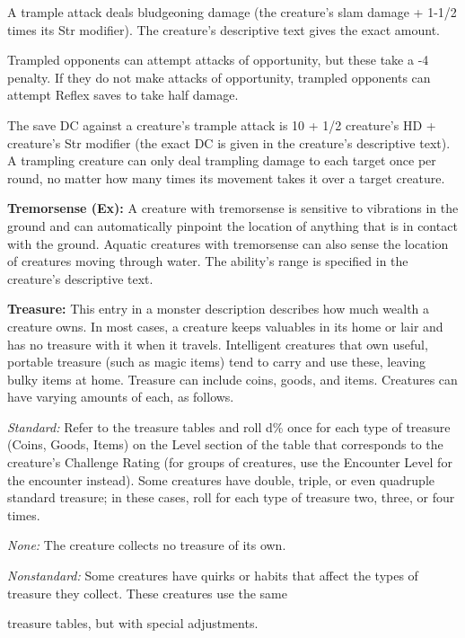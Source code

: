 \documentclass{article}
\begin{document}
A trample attack deals bludgeoning damage (the creature's slam damage + 1-1/2 times 
its Str modifier). The creature's descriptive text gives the exact amount.

Trampled opponents can attempt attacks of opportunity, but these take a -4 penalty. 
If they do not make attacks of opportunity, trampled opponents can attempt Reflex 
saves to take half damage.

The save DC against a creature's trample attack is 10 + 1/2 creature's HD + creature's 
Str modifier (the exact DC is given in the creature's descriptive text). A trampling 
creature can only deal trampling damage to each target once per round, no matter 
how many times its movement takes it over a target creature.

\vspace{12pt}
\textbf{Tremorsense (Ex): }A creature with tremorsense is sensitive to vibrations 
in the ground and can automatically pinpoint the location of anything that is in 
contact with the ground. Aquatic creatures with tremorsense can also sense the 
location of creatures moving through water. The ability's range is specified in 
the creature's descriptive text.

\vspace{12pt}
\textbf{Treasure:} This entry in a monster description describes how much wealth 
a creature owns. In most cases, a creature keeps valuables in its home or lair 
and has no treasure with it when it travels. Intelligent creatures that own useful, 
portable treasure (such as magic items) tend to carry and use these, leaving bulky 
items at home. Treasure can include coins, goods, and items. Creatures can have 
varying amounts of each, as follows.

\textit{Standard: }Refer to the treasure tables\textit{ }and roll d\% once for 
each type of treasure (Coins, Goods, Items) on the Level section of the table that 
corresponds to the creature's Challenge Rating (for groups of creatures, use the 
Encounter Level for the encounter instead). Some creatures have double, triple, 
or even quadruple standard treasure; in these cases, roll for each type of treasure 
two, three, or four times.

\textit{None: }The creature collects no treasure of its own.

\textit{Nonstandard: }Some creatures have quirks or habits that affect the types 
of treasure they collect. These creatures use the same

treasure tables, but with special adjustments.
\end{document}
